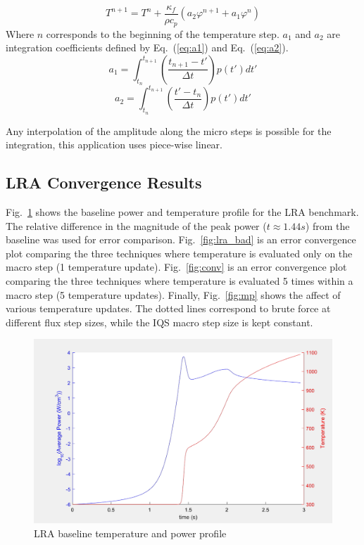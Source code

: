 \documentclass{anstrans}
\newcommand{\eqt}[1]{Eq.~(\ref{#1})}                     %
\newcommand{\fig}[1]{Fig.~\ref{#1}}                      %
\newcommand{\be}{\begin{equation}}
\newcommand{\ee}{\end{equation}}
\begin{document}
\be
T^{n+1} = T^n + \frac{\kappa_f}{\rho c_p} \left(a_2 \varphi^{n+1} + a_1 \varphi^{n}\right)
\label{eq:temp_an}
\ee
Where $n$ corresponds to the beginning of the temperature step.  $a_1$ and $a_2$ are integration coefficients defined by \eqt{eq:a1} and \eqt{eq:a2}.
\be
a_1 = \int_{t_n}^{t_{n+1}}\left(\frac{t_{n+1}-t'}{\Delta t}\right)p(t')dt'
\label{eq:a1}
\ee
\be
a_2 = \int_{t_n}^{t_{n+1}}\left(\frac{t'-t_n}{\Delta t}\right)p(t')dt'
\label{eq:a2}
\ee

Any interpolation of the amplitude along the micro steps is possible for the integration, this application uses piece-wise linear.

\subsection{LRA Convergence Results}

\fig{fig:lra_profile} shows the baseline power and temperature profile for the LRA benchmark.  The relative difference in the magnitude of the peak power ($t\approx1.44 s$) from the baseline was used for error comparison.  \fig{fig:lra_bad} is an error convergence plot comparing the three techniques where temperature is evaluated only on the macro step (1 temperature update).  \fig{fig:conv} is an error convergence plot comparing the three techniques where temperature is evaluated 5 times within a macro step (5 temperature updates).  Finally, \fig{fig:mp} shows the affect of various temperature updates. The dotted lines correspond to brute force at different flux step sizes, while the IQS macro step size is kept constant.

\begin{figure}[htbp!]
\includegraphics[width=\linewidth]{lra_profile.png}
\caption{LRA baseline temperature and power profile}
\label{fig:lra_profile}
\end{figure}
\end{document}
